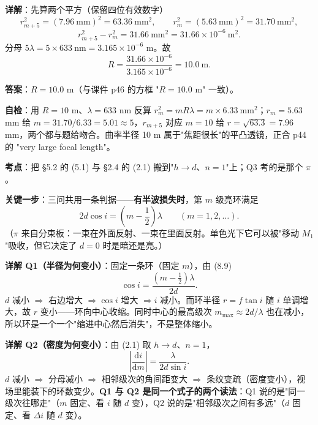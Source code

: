 \documentclass[10pt]{ctexart}
\renewcommand{\qbreak}{\needspace{0.50\textheight}}
\begin{document}
\textbf{详解}：先算两个平方（保留四位有效数字）
\[
r_{m+5}^2=(7.96\ \mathrm{mm})^2=63.36\ \mathrm{mm}^2,\qquad
r_m^2=(5.63\ \mathrm{mm})^2=31.70\ \mathrm{mm}^2,
\]
\[
r_{m+5}^2-r_m^2=31.66\ \mathrm{mm}^2=31.66\times10^{-6}\ \mathrm{m}^2 .
\]
分母 $5\lambda=5\times633\ \mathrm{nm}=3.165\times10^{-6}$ m。故
\[
R=\frac{31.66\times10^{-6}}{3.165\times10^{-6}}=10.0\ \mathrm{m}. \tag{8.8}
\]

\textbf{答案}：$R=10.0$ m（与课件 p46 的方框 "$R=10.0$ m" 一致）。

\textbf{自检}：用 $R=10$ m、$\lambda=633$ nm 反算 $r_m^2=mR\lambda=m\times6.33\ \mathrm{mm}^2$；$r_m=5.63$ mm 给 $m=31.70/6.33=5.01\approx5$，$r_{m+5}$ 对应 $m=10$ 给 $r=\sqrt{63.3}=7.96$ mm，两个都与题给吻合。曲率半径 10 m 属于"焦距很长"的平凸透镜，正合 p44 的 "very large focal length"。


\qbreak
{}

\textbf{考点}：把 \S5.2 的 (5.1) 与 \S2.4 的 (2.1) 搬到"$h\to d$、$n=1$"上；Q3 考的是那个 $\pi$。

\textbf{关键一步}：三问共用一条判据——\textbf{有半波损失时}，第 $m$ 级亮环满足
\[
2d\cos i=\left(m-\frac12\right)\lambda \qquad(m=1,2,\dots). \tag{8.9}
\]
（$\pi$ 来自分束板：一束在外面反射、一束在里面反射。单色光下它可以被"移动 $M_1$"吸收，但它决定了 $d=0$ 时是暗还是亮。）

\textbf{详解 Q1（半径为何变小）}：固定一条环（固定 $m$），由 (8.9)
\[
\cos i=\frac{(m-\frac12)\lambda}{2d} . \tag{8.10}
\]
$d$ 减小 $\Rightarrow$ 右边增大 $\Rightarrow\cos i$ 增大 $\Rightarrow i$ 减小。而环半径 $r=f\tan i$ 随 $i$ 单调增大，故 $r$ 变小——环向中心收缩。同时中心的最高级次 $m_{\max}\approx2d/\lambda$ 也在减小，所以环是一个一个"缩进中心然后消失"，不是整体缩小。

\textbf{详解 Q2（密度为何变小）}：由 (2.1) 取 $h\to d$、$n=1$，
\[
\left|\frac{\mathrm{d}i}{\mathrm{d}m}\right|=\frac{\lambda}{2d\sin i}. \tag{8.11}
\]
$d$ 减小 $\Rightarrow$ 分母减小 $\Rightarrow$ 相邻级次的角间距变大 $\Rightarrow$ 条纹变疏（密度变小），视场里能装下的环数变少。\textbf{Q1 与 Q2 是同一个式子的两个读法}：Q1 说的是"同一级次往哪走"（$m$ 固定、看 $i$ 随 $d$ 变），Q2 说的是"相邻级次之间有多远"（$d$ 固定、看 $\Delta i$ 随 $d$ 变）。
\end{document}

